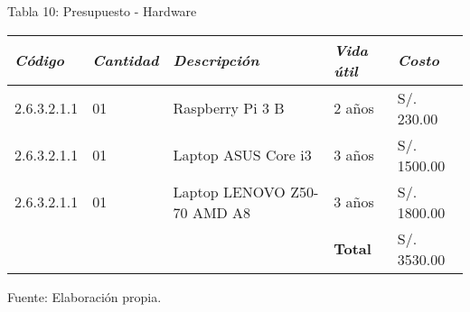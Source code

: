             \begin{table}[h!]
                \centering
                { Tabla 10: Presupuesto - Hardware}\par
                \begin{tabular}{|p{2cm}|p{1.8cm}|p{3.8cm}|p{1.8cm}|p{2cm}|} \hline
                    
                
                \textit{{\bf{Código}}} &
                \textit{{\bf{Cantidad}}} &
                \textit{{\bf{Descripción}}} &
                \textit{{\bf{Vida útil}}}  &
                \textit{{\bf{Costo}}}
                \\ \hline

                2.6.3.2.1.1 &
                01 &
                Raspberry Pi 3 B &
                2 años &
                S/. 230.00
                \\ \hline

                2.6.3.2.1.1 &
                01 &
                Laptop ASUS Core i3 &
                3 años &
                S/. 1500.00
                \\ \hline

                2.6.3.2.1.1&
                01 &
                Laptop LENOVO Z50-70 AMD A8 &
                3 años &
                S/. 1800.00
                \\ \hline

                &
                &
                &
                \bf{Total} &
                S/. 3530.00
                \\ \hline

                \end{tabular}
                \begin{center}
                    \vskip -0.2cm
                    {\small{Fuente: Elaboración propia.}}
                \end{center}
            \end{table}

